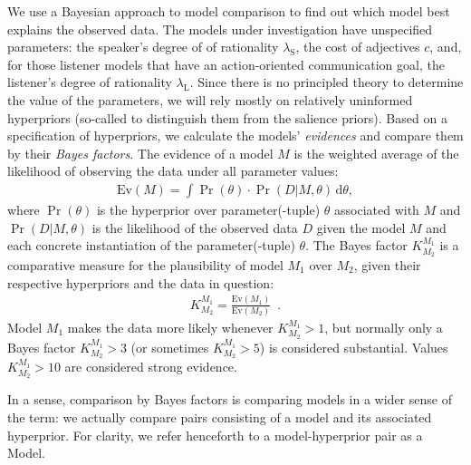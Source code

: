 We use a Bayesian approach to model comparison
\cite{Jeffreys1961:Theory-of-Proba,KassRaftery1995:Bayes-Factors,Jaynes2003:Probability-The,VandekerckhoveMatzke2013:Model-Compariso} to find out which
model best explains the observed data. The models under investigation
have unspecified parameters: the speaker's degree of of rationality
$\lambda_\mathrm{S}$, the cost of adjectives $c$, and, for those
listener models that have an action-oriented communication goal, the
listener's degree of rationality $\lambda_\mathrm{L}$. Since there is
no principled theory to determine the value of the parameters, we will
rely mostly on relatively uninformed hyperpriors (so-called to
distinguish them from the salience priors). Based on a specification
of hyperpriors, we calculate the models' \emph{evidences} and compare
them by their \emph{Bayes factors}. The evidence of a model $M$ is the
weighted average of the likelihood of observing the data under all
parameter values:
\begin{align}
  \label{BMA}
  \mathrm{Ev}(M)= \int \Pr(\theta) \cdot \Pr(D | M, \theta)\, \mathrm{d}\theta,
\end{align}
where $\Pr(\theta)$ is the hyperprior over parameter(-tuple) $\theta$
associated with $M$ and $\Pr(D | M, \theta)$ is the likelihood of the
observed data $D$ given the model $M$ and each concrete instantiation
of the parameter(-tuple) $\theta$. The Bayes factor
$K^{M_1}_{M_2}$ is a comparative measure for the plausibility of model
$M_1$ over $M_2$, given their respective hyperpriors and the data in
question:
\begin{align}
  K^{M_1}_{M_2} = \frac{\mathrm{Ev}(M_1)}{\mathrm{Ev}(M_2)} \enspace .
\end{align}
Model $M_1$ makes the data more likely whenever $K^{M_1}_{M_2} > 1$, but
normally only a Bayes factor $K^{M_1}_{M_2} >3$ (or sometimes
$K^{M_1}_{M_2} > 5$) is considered substantial. Values $K^{M_1}_{M_2}
> 10$ are considered strong evidence.

In a sense, comparison by Bayes factors is comparing models in a wider
sense of the term: we actually compare pairs consisting of a model and
its associated hyperprior. For clarity, we refer henceforth to a
model-hyperprior pair as a Model.

